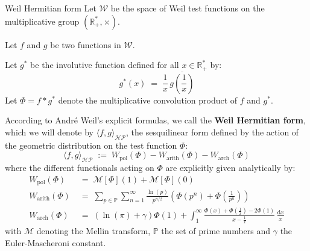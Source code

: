 \documentclass[Riemann_Hypothesis.tex]{subfiles}
\begin{document}
\begin{DefNefEn}[label=df:FormeHermitienneWeil]{Weil Hermitian form}
    Let $\mathcal{W}$ be the space of Weil test functions on the multiplicative group $\left(\mathbb{R}_+^*, \times\right)$. \par
    Let $f$ and $g$ be two functions in $\mathcal{W}$. \par
    Let $g^*$ be the involutive function defined for all $x \in \mathbb{R}_+^*$ by:
    \begin{equation*}
        g^*(x) \;=\; \frac{1}{x} \, \overline{g\left(\frac{1}{x}\right)}
    \end{equation*}
    Let $\Phi = f * g^*$ denote the multiplicative convolution product of $f$ and $g^*$. \par
    According to André Weil's explicit formulas, we call the \textbf{Weil Hermitian form}, which we will denote by $\langle f, g \rangle_{\mathcal{HP}}$, the sesquilinear form defined by the action of the geometric distribution on the test function $\Phi$:
    \begin{equation*}
        \langle f, g \rangle_{\mathcal{HP}} \;:=\; W_{\text{pol}}(\Phi) - W_{\text{arith}}(\Phi) - W_{\text{arch}}(\Phi)
    \end{equation*}
    where the different functionals acting on $\Phi$ are explicitly given analytically by:
    \begin{align*}
        W_{\text{pol}}(\Phi) \;&=\; \mathcal{M}[\Phi](1) + \mathcal{M}[\Phi](0) \\
        W_{\text{arith}}(\Phi) \;&=\; \sum_{p \in \mathbb{P}} \sum_{n=1}^{\infty} \frac{\ln(p)}{p^{n/2}} \left( \Phi(p^n) + \Phi\left(\frac{1}{p^n}\right) \right) \\
        W_{\text{arch}}(\Phi) \;&=\; \left( \ln(\pi) + \gamma \right) \Phi(1) + \int_{1}^{\infty} \frac{\Phi(x) + \Phi\left(\frac{1}{x}\right) - 2\Phi(1)}{x - \frac{1}{x}} \, \frac{\mathrm{d}x}{x}
    \end{align*}
    with $\mathcal{M}$ denoting the Mellin transform, $\mathbb{P}$ the set of prime numbers and $\gamma$ the Euler-Mascheroni constant.
\end{DefNefEn}
\end{document}
